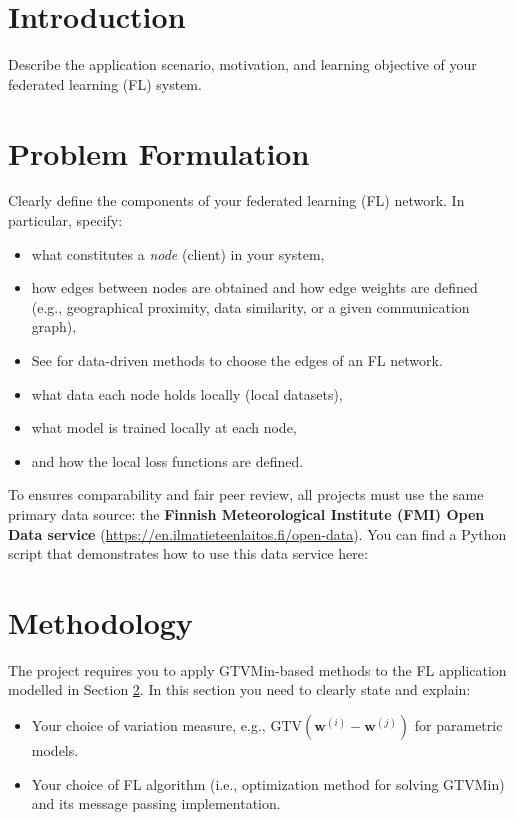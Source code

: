 \documentclass[9pt]{article}
\begin{document}
\section{Introduction}

\begin{hintbox}
	Describe the application scenario, motivation, and learning objective of your 
	federated learning (FL) system.
\end{hintbox}

	
\section{Problem Formulation}
\label{sec:pf}
\begin{hintbox}
	Clearly define the components of your federated learning (FL) network.
	In particular, specify:
	\begin{itemize}
		\item what constitutes a \emph{node} (client) in your system,
		\item how edges between nodes are obtained and how edge weights are defined
		(e.g., geographical proximity, data similarity, or a given communication graph),
		\item See \cite[Ch. 7]{Jung2025} for data-driven methods to choose the edges of an FL network. 
		\item what data each node holds locally (local datasets),
		\item what model is trained locally at each node,
		\item and how the local loss functions are defined.
	\end{itemize}
\end{hintbox}

\begin{hintbox}
	To ensures comparability and fair peer review, all projects must 
	use the same primary data source: the
	\textbf{Finnish Meteorological Institute (FMI) Open Data service}
	(\url{https://en.ilmatieteenlaitos.fi/open-data}). 
	You can find a Python script that demonstrates how to use this data service here: 
	
\end{hintbox}

	
\section{Methodology}
\label{sec_meth} 
\begin{hintbox}
The project requires you to apply GTVMin-based methods to 
the FL application modelled in Section \ref{sec:pf}. In this section 
you need to clearly state and explain:
\begin{itemize}
	\item Your choice of variation measure, e.g., $\mathrm{GTV}(\mathbf{w}^{(i)}-\mathbf{w}^{(j)})$
	for parametric models.
	\item Your choice of FL algorithm (i.e., optimization method for solving 
	GTVMin) and its message passing implementation.
\end{itemize}
\end{hintbox}
\end{document}
